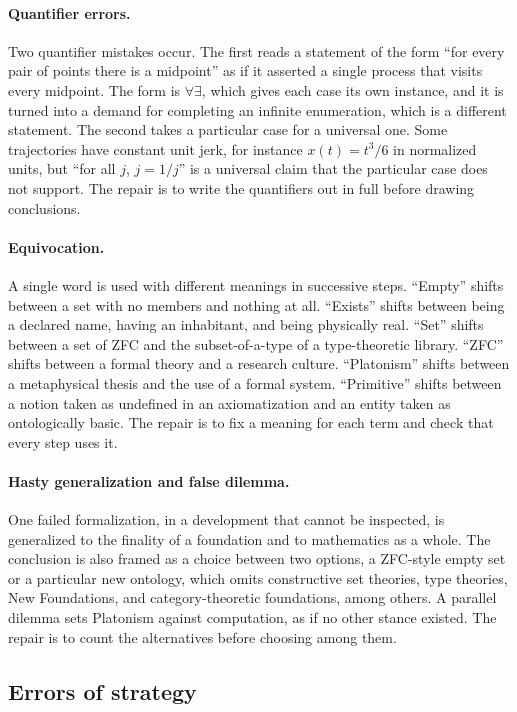 \documentclass[11pt]{article}
\begin{document}
\paragraph{Quantifier errors.} Two quantifier mistakes occur. The first reads a statement of the form ``for every pair of points there is a midpoint'' as if it asserted a single process that visits every midpoint. The form is $\forall\exists$, which gives each case its own instance, and it is turned into a demand for completing an infinite enumeration, which is a different statement. The second takes a particular case for a universal one. Some trajectories have constant unit jerk, for instance $x(t)=t^3/6$ in normalized units, but ``for all $j$, $j=1/j$'' is a universal claim that the particular case does not support. The repair is to write the quantifiers out in full before drawing conclusions.

\paragraph{Equivocation.} A single word is used with different meanings in successive steps. ``Empty'' shifts between a set with no members and nothing at all. ``Exists'' shifts between being a declared name, having an inhabitant, and being physically real. ``Set'' shifts between a set of ZFC and the subset-of-a-type of a type-theoretic library. ``ZFC'' shifts between a formal theory and a research culture. ``Platonism'' shifts between a metaphysical thesis and the use of a formal system. ``Primitive'' shifts between a notion taken as undefined in an axiomatization and an entity taken as ontologically basic. The repair is to fix a meaning for each term and check that every step uses it.

\paragraph{Hasty generalization and false dilemma.} One failed formalization, in a development that cannot be inspected, is generalized to the finality of a foundation and to mathematics as a whole. The conclusion is also framed as a choice between two options, a ZFC-style empty set or a particular new ontology, which omits constructive set theories, type theories, New Foundations, and category-theoretic foundations, among others. A parallel dilemma sets Platonism against computation, as if no other stance existed. The repair is to count the alternatives before choosing among them.

\subsection{Errors of strategy}
\end{document}
